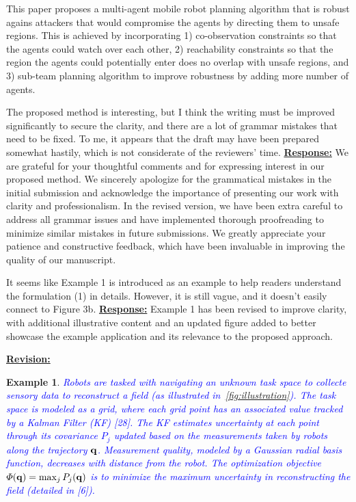 \documentclass{article}
\newtheorem{example}{Example}
\newcommand{\rv}{{\Large{\underline{\textbf{Revision:}}}}\quad}
\newcommand{\new}[1]{\textcolor{blue}{#1}}
\begin{document}
\begin{cmt*}{}{}

	This paper proposes a multi-agent mobile robot planning algorithm that
	is robust agains attackers that would compromise the agents by
	directing them to unsafe regions. This is achieved by incorporating 1)
	co-observation constraints so that the agents could watch over each
	other, 2) reachability constraints so that the region the agents could
	potentially enter does no overlap with unsafe regions, and 3) sub-team
	planning algorithm to improve robustness by adding more number of
	agents.
	
	The proposed method is interesting, but I think the writing must be
	improved significantly to secure the clarity, and there are a lot of
	grammar mistakes that need to be fixed. To me, it appears that the
	draft may have been prepared somewhat hastily, which is not considerate
	of the reviewers' time.
	\tcblower
	\underline{\textbf{Response:}} We are grateful for your thoughtful comments and for expressing interest in our proposed method. We sincerely apologize for the grammatical mistakes in the initial submission and acknowledge the importance of presenting our work with clarity and professionalism. In the revised version, we have been extra careful to address all grammar issues and have implemented thorough proofreading to minimize similar mistakes in future submissions. We greatly appreciate your patience and constructive feedback, which have been invaluable in improving the quality of our manuscript.

\end{cmt*}
\vspace{0.1cm}
\begin{cmt}{}{}        %
	It seems like Example 1 is introduced as an example to help
	readers understand the formulation (1) in details. However, it is still
	vague, and it doesn't easily connect to Figure 3b.
	\tcblower
	\underline{\textbf{Response:}} Example 1 has been revised to improve clarity, with additional illustrative content and an updated figure added to better showcase the example application and its relevance to the proposed approach.
\end{cmt}
\rv
\begin{example}\label{example:map_exploration}
\new{Robots are tasked with navigating an unknown task space to collecte sensory data to reconstruct a field (as illustrated in~\cref{fig:illustration}). The task space is modeled as a grid, where each grid point has an associated value tracked by a Kalman Filter (KF) [28]. The KF estimates uncertainty at each point through its covariance $P_j$ updated based on the measurements taken by robots along the trajectory $\mathbf{q}$. Measurement quality, modeled by a Gaussian radial basis function, decreases with distance from the robot. The optimization objective $\varPhi(\mathbf{q})=\max_j P_j(\mathbf{q})$ is to minimize the maximum uncertainty in reconstructing the field (detailed in [6]). }
\end{example}
\end{document}
